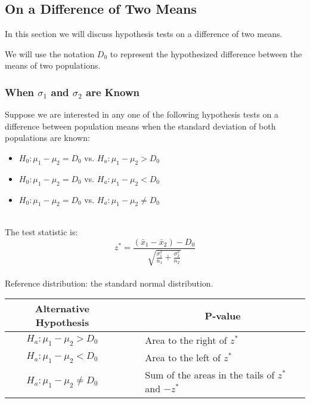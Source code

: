 \subsection{On a Difference of Two Means}

In this section we will discuss hypothesis tests on a difference of two means.

\begin{nt}
We will use the notation $D_{0}$ to represent the hypothesized difference 
between the means of two populations.
\end{nt}



\subsubsection{When $\sigma_{1}$ and $\sigma_{2}$ are Known}

\begin{hyp}
Suppose we are interested in any one of the following hypothesis tests
on a difference between population means 
when the standard deviation of both populations are known:\\

\begin{itemize}
\item	$H_{0} : \mu_{1} - \mu_{2}  = D_{0}$  vs. $H_{a}  : \mu_{1} - \mu_{2}  > D_{0}$
\item	$H_{0} : \mu_{1} - \mu_{2}  = D_{0}$  vs. $H_{a}  : \mu_{1} - \mu_{2}  < D_{0}$
\item	$H_{0} : \mu_{1} - \mu_{2}  = D_{0}$  vs. $H_{a}  : \mu_{1} - \mu_{2}  \neq D_{0}$
\end{itemize}

\hfill\\
The test statistic is:
\begin{equation}
z^{*}	= \displaystyle\frac{ ( \bar{x}_{1} - \bar{x}_{2} ) - D_{0} }{ \sqrt{ \displaystyle\frac{\sigma_{1}^{2} }{n_{1}} 
+ \displaystyle\frac{\sigma_{2}^{2} }{n_{2}}  } }
\end{equation}
\hfill\\
Reference distribution: the standard normal distribution.\\

\begin{center}
\begin{tabular}{ccl}
Alternative Hypothesis	&	~\quad~	&	\multicolumn{1}{c}{P-value}	\\
\hline
$H_{a}  : \mu_{1} - \mu_{2}  > D_{0}$		&	&	Area to the right of $z^{*}$	\\
$H_{a}  : \mu_{1} - \mu_{2}  < D_{0}$		&	&	Area to the left of $z^{*}$	\\
$H_{a}  : \mu_{1} - \mu_{2}  \neq D_{0}$	&	&	Sum of the areas in the tails of $z^{*}$ and $-z^{*}$
\end{tabular}
\end{center}

\end{hyp}



